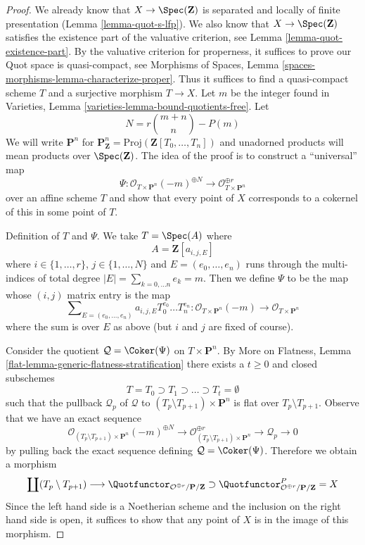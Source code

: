 \begin{proof}
We already know that $X \to \Spec(\mathbf{Z})$ is separated and
locally of finite presentation (Lemma \ref{lemma-quot-s-lfp}).
We also know that $X \to \Spec(\mathbf{Z})$ satisfies the
existence part of the valuative criterion, see
Lemma \ref{lemma-quot-existence-part}.
By the valuative criterion for properness, it suffices to
prove our Quot space is quasi-compact, see
Morphisms of Spaces,
Lemma \ref{spaces-morphisms-lemma-characterize-proper}.
Thus it suffices to find a quasi-compact scheme $T$ and a surjective
morphism $T \to X$. Let $m$ be the integer found in
Varieties, Lemma \ref{varieties-lemma-bound-quotients-free}.
Let
$$
N = r{m + n \choose n} - P(m)
$$
We will write $\mathbf{P}^n$ for
$\mathbf{P}^n_\mathbf{Z} = \text{Proj}(\mathbf{Z}[T_0, \ldots, T_n])$
and unadorned products will mean products over $\Spec(\mathbf{Z})$.
The idea of the proof is to construct a ``universal'' map
$$
\Psi :
\mathcal{O}_{T \times \mathbf{P}^n}(-m)^{\oplus N}
\longrightarrow
\mathcal{O}_{T \times \mathbf{P}^n}^{\oplus r}
$$
over an affine scheme $T$ and show that every point of $X$
corresponds to a cokernel of this in some point of $T$.

\medskip\noindent
Definition of $T$ and $\Psi$. We take $T = \Spec(A)$ where
$$
A = \mathbf{Z}[a_{i, j, E}]
$$
where $i \in \{1, \ldots, r\}$, $j \in \{1, \ldots, N\}$
and $E = (e_0, \ldots, e_n)$ runs through the multi-indices
of total degree $|E| = \sum_{k = 0, \ldots n} e_k = m$.
Then we define $\Psi$ to be the map whose $(i, j)$ matrix
entry is the map
$$
\sum\nolimits_{E = (e_0, \ldots, e_n)}
a_{i, j, E} T_0^{e_0} \ldots T_n^{e_n} :
\mathcal{O}_{T \times \mathbf{P}^n}(-m)
\longrightarrow
\mathcal{O}_{T \times \mathbf{P}^n}
$$
where the sum is over $E$ as above (but $i$ and $j$ are fixed of course).

\medskip\noindent
Consider the quotient $\mathcal{Q} = \Coker(\Psi)$ on $T \times \mathbf{P}^n$.
By More on Flatness, Lemma \ref{flat-lemma-generic-flatness-stratification}
there exists a $t \geq 0$ and closed subschemes
$$
T = T_0 \supset T_1 \supset \ldots \supset T_t = \emptyset
$$
such that the pullback $\mathcal{Q}_p$ of $\mathcal{Q}$ to
$(T_p \setminus T_{p + 1}) \times \mathbf{P}^n$ is flat over
$T_p \setminus T_{p + 1}$. Observe that we
have an exact sequence
$$
\mathcal{O}_{(T_p \setminus T_{p + 1}) \times \mathbf{P}^n}(-m)^{\oplus N}
\to
\mathcal{O}_{(T_p \setminus T_{p + 1}) \times \mathbf{P}^n}^{\oplus r}
\to
\mathcal{Q}_p
\to
0
$$
by pulling back the exact sequence defining $\mathcal{Q} = \Coker(\Psi)$.
Therefore we obtain a morphism
$$
\coprod (T_p \setminus T_{p + 1})
\longrightarrow
\Quotfunctor_{\mathcal{O}^{\oplus r}/\mathbf{P}/\mathbf{Z}}
\supset
\Quotfunctor^P_{\mathcal{O}^{\oplus r}/\mathbf{P}/\mathbf{Z}} = X
$$
Since the left hand side is a Noetherian scheme and the inclusion
on the right hand side is open, it
suffices to show that any point of $X$ is in the image of this morphism.


\end{proof}
